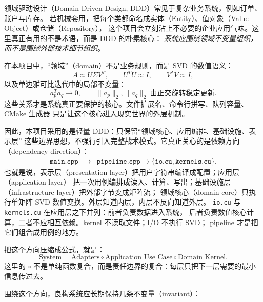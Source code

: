 领域驱动设计（Domain-Driven Design, DDD）常见于复杂业务系统，例如订单、账户与库存。
若机械套用，把每个类都命名成实体（Entity）、值对象（Value Object）或仓储（Repository），
这个项目会立刻沾上不必要的企业应用气味。这里真正有用的不是术语，而是 DDD 的朴素核心：
\emph{系统应围绕领域不变量组织，而不是围绕外部技术细节组织}。

在本项目中，“领域”（domain）不是业务规则，而是 SVD 的数值语义：
\[
    A \approx U\Sigma V^T,
    \qquad
    U^TU \approx I,
    \qquad
    V^TV \approx I,
\]
以及单边雅可比迭代中的局部不变量：
\[
    a_p^Ta_q \rightarrow 0,
    \qquad
    \lVert a_p\rVert_2,\lVert a_q\rVert_2
    \ \text{由正交旋转稳定更新}.
\]
这些关系才是系统真正要保护的核心。文件扩展名、命令行拼写、队列容量、CMake 生成器
只是让这个核心进入现实世界的外层机制。

因此，本项目采用的是轻量 DDD：只保留“领域核心、应用编排、基础设施、表示层”
这些边界思想，不强行引入完整战术模式。它真正关心的是依赖方向（dependency direction）：
\[
    \begin{array}{ccl}
        \texttt{main.cpp}
         & \longrightarrow &
        \texttt{pipeline.cpp}
        \longrightarrow
        \{\texttt{io.cu},\texttt{kernels.cu}\}.
    \end{array}
\]
也就是说，表示层（presentation layer）把用户字符串编译成配置；应用层（application layer）
把一次用例编排成读入、计算、写出；基础设施层（infrastructure layer）把外部字节变成矩阵流；
领域核心（domain core）只执行单矩阵 SVD 数值变换。外层知道内层，内层不反向知道外层。
\texttt{io.cu} 与 \texttt{kernels.cu} 在应用层之下并列：前者负责数据进入系统，
后者负责数值核心计算，二者不应相互依赖。kernel 不读取文件；I/O 不执行 SVD；
pipeline 才是把它们组合成用例的地方。

把这个方向压缩成公式，就是：
\[
    \text{System}
    =
    \text{Adapters}
    \circ
    \text{Application Use Case}
    \circ
    \text{Domain Kernel}.
\]
这里的 \(\circ\) 不是单纯函数复合，而是责任边界的复合：每层只把下一层需要的最小信息传过去。

围绕这个方向，良构系统应长期保持几条不变量（invariant）：

